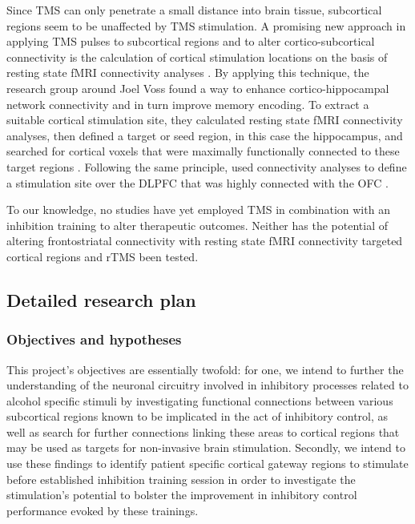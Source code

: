 \documentclass[12pt]{article}
\begin{document}
Since TMS can only penetrate a small distance into brain tissue, subcortical regions seem to be unaffected by TMS stimulation. A promising new approach in applying TMS pulses to subcortical regions and to alter cortico-subcortical connectivity is the calculation of cortical stimulation locations on the basis of resting state fMRI connectivity analyses \parencite{wangTargetedEnhancementCorticalhippocampal2014}. By applying this technique, the research group around Joel Voss found a way to enhance cortico-hippocampal network connectivity and in turn improve memory encoding. To extract a suitable cortical stimulation site, they calculated resting state fMRI connectivity analyses, then defined a target or seed region, in this case the hippocampus, and searched for cortical voxels that were maximally functionally connected to these target regions \parencite{hermillerEvidenceImmediateEnhancement2020}. Following the same principle, \textcite{howardTargetedStimulationHuman2020} used connectivity analyses to define a stimulation site over the DLPFC that was highly connected with the OFC \parencite{howardTargetedStimulationHuman2020}. 

To our knowledge, no studies have yet employed TMS in combination with an inhibition training to alter therapeutic outcomes. Neither has the potential of altering frontostriatal connectivity with resting state fMRI connectivity targeted cortical regions and rTMS been tested.

\subsection{Detailed research plan}


\subsubsection{Objectives and hypotheses}

This project's objectives are essentially twofold: for one, we intend to further the understanding of the neuronal circuitry involved in inhibitory processes related to alcohol specific stimuli by investigating functional connections between various subcortical regions known to be implicated in the act of inhibitory control, as well as search for further connections linking these areas to cortical regions that may be used as targets for non-invasive brain stimulation. Secondly, we intend to use these findings to identify patient specific cortical gateway regions to stimulate before established inhibition training session in order to investigate the stimulation's potential to bolster the improvement in inhibitory control performance evoked by these trainings.
\end{document}
